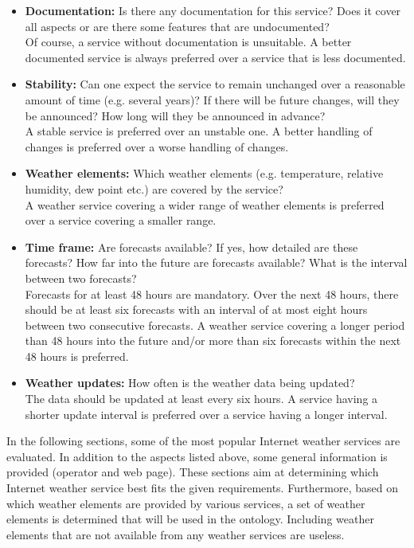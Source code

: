 \begin{itemize}
  \item \textbf{Documentation:} Is there any documentation for this service? Does it cover all aspects or are there some features that are undocumented?\\
  Of course, a service without documentation is unsuitable. A better documented service is always preferred over a service that is less documented.
  
  \item \textbf{Stability:} Can one expect the service to remain unchanged over a reasonable amount of time (e.g. several years)? If there will be future changes, will they be announced? How long will they be announced in advance?\\
  A stable service is preferred over an unstable one. A better handling of changes is preferred over a worse handling of changes.
  
  \item \textbf{Weather elements:} Which weather elements (e.g. temperature, relative humidity, dew point etc.) are covered by the service?\\
  A weather service covering a wider range of weather elements is preferred over a service covering a smaller range.
  
  \item \textbf{Time frame:} Are forecasts available? If yes, how detailed are these forecasts? How far into the future are forecasts available? What is the interval between two forecasts?\\
  Forecasts for at least 48 hours are mandatory. Over the next 48 hours, there should be at least six forecasts with an interval of at most eight hours between two consecutive forecasts. A weather service covering a longer period than 48 hours into the future and/or more than six forecasts within the next 48 hours is preferred.
  
  \item \textbf{Weather updates:} How often is the weather data being updated?\\
  The data should be updated at least every six hours. A service having a shorter update interval is preferred over a service having a longer interval.
\end{itemize}

In the following sections, some of the most popular Internet weather services are evaluated. In addition to the aspects listed above, some general information is provided (operator and web page). These sections aim at determining which Internet weather service best fits the given requirements. Furthermore, based on which weather elements are provided by various services, a set of weather elements is determined that will be used in the ontology. Including weather elements that are not available from any weather services are useless.

